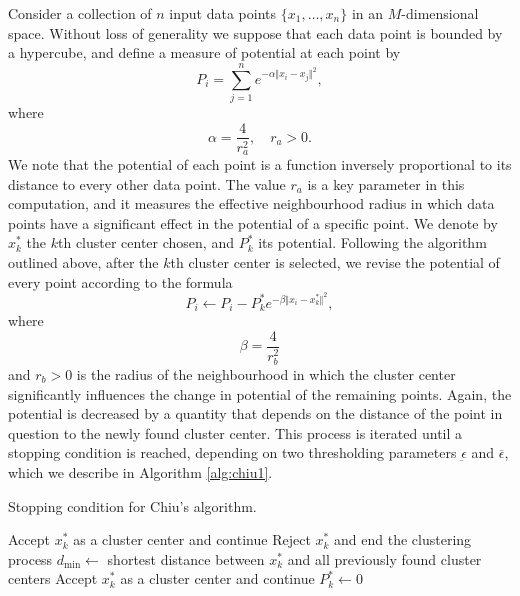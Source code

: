 Consider a collection of $n$ input data points $\{x_1,\dots,x_n\}$ in an $M$-dimensional space. Without loss of generality we suppose that each data point is bounded by a hypercube, and define a measure of potential at each point by
\begin{equation} \label{eq:chiu-pot}
P_i = \sum_{j=1}^n e^{-\alpha \Vert x_i-x_j \Vert^2},
\end{equation}
where
\[
\alpha = \frac{4}{r_a^2}, \quad r_a > 0.
\]
We note that the potential of each point is a function inversely proportional to its distance to every other data point. The value $r_a$ is a key parameter in this computation, and it measures the effective neighbourhood radius in which data points have a significant effect in the potential of a specific point. We denote by $x_k^\ast$ the $k$th cluster center chosen, and $P_k^\ast$ its potential. Following the algorithm outlined above, after the $k$th cluster center is selected, we revise the potential of every point according to the formula
\[
P_i \leftarrow P_i - P_k^\ast e^{-\beta \Vert x_i - x_k^\ast \Vert^2},
\]
where
\[
\beta = \frac{4}{r_b^2}
\]
and $r_b>0$ is the radius of the neighbourhood in which the cluster center significantly influences the change in potential of the remaining points. Again, the potential is decreased by a quantity that depends on the distance of the point in question to the newly found cluster center. This process is iterated until a stopping condition is reached, depending on two thresholding parameters $\underbar{\epsilon}$ and $\overbar{\epsilon}$, which we describe in Algorithm \ref{alg:chiu1}.

\begin{algorithm}
  \caption{Stopping condition for Chiu's algorithm.}
    \label{alg:chiu1}
  \begin{algorithmic}
      \State Accept $x_k^\ast$ as a cluster center and continue
      \State Reject $x_k^\ast$ and end the clustering process
    \Else
      \State $d_{\text{min}}\gets$ shortest distance between $x_k^\ast$ and all previously found cluster centers
        \State Accept $x_k^\ast$ as a cluster center and continue
      \Else
        \State$P_k^\ast \gets 0$
      \EndIf
  \EndIf
  \end{algorithmic}
\end{algorithm}


